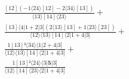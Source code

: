 \documentclass[varwidth, border=5pt]{standalone}
\begin{document}
\begin{my}
$\begin{gathered}
\scriptscriptstyle\frac{[12](-1⟨24⟩[12]-2⟨34⟩[13])}{⟨13⟩[14]⟨23⟩} +\\
\scriptscriptstyle\frac{[13]⟨4|1+2|3](2⟨13⟩[13]+1⟨23⟩[23])}{⟨12⟩⟨13⟩[14]⟨2|1+4|3]} +\\
\scriptscriptstyle\frac{1[13]²⟨34⟩⟨1|2+4|3]}{⟨12⟩⟨13⟩[14]⟨2|1+4|3]} +\\
\scriptscriptstyle\frac{1[13]²⟨24⟩⟨3|𝟓|3]}{⟨12⟩[14]⟨23⟩⟨2|1+4|3]} \phantom{+}
\end{gathered}$
\end{my}
\end{document}
